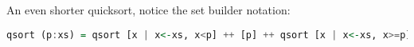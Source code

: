 \documentclass[presentation.tex]{subfiles}
\begin{document}
\begin{frame}[fragile]
  \vspace{\baselineskip}
  An even shorter quicksort, notice the set builder notation:
  
  \begin{lstlisting}[language=Haskell]
    qsort (p:xs) = qsort [x | x<-xs, x<p] ++ [p] ++ qsort [x | x<-xs, x>=p]
  \end{lstlisting}
\end{frame}
\end{document}
